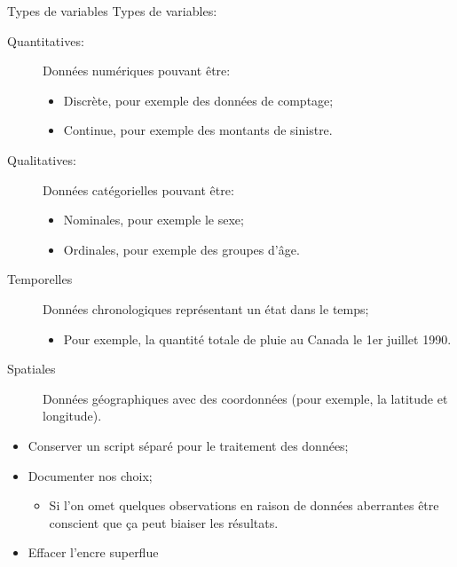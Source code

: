 \documentclass[10pt, french]{article}
\begin{document}
\begin{multicols*}{3}
\begin{conceptgen}{Types de variables}
Types de variables:
\begin{description}
	\item[Quantitatives:]	Données numériques pouvant être:
		\begin{itemize}
		\item	Discrète, pour exemple des données de comptage; 
		\item	Continue, pour exemple des montants de sinistre.
		\end{itemize}
	\item[Qualitatives:]	Données catégorielles pouvant être:
		\begin{itemize}
		\item	Nominales, pour exemple le sexe; 
		\item	Ordinales, pour exemple des groupes d'âge.
		\end{itemize}
	\item[Temporelles]Données chronologiques représentant un état dans le temps;
		\begin{itemize}
		\item	Pour exemple, la quantité totale de pluie au Canada le 1er juillet 1990.
		\end{itemize}
	\item[Spatiales]	Données géographiques avec des coordonnées (pour exemple, la latitude et longitude).
\end{description}
\end{conceptgen}

\begin{algo2}[Conseils]
\begin{itemize}
	\item	Conserver un script séparé pour le traitement des données;
	\item	Documenter nos choix;
		\begin{itemize}
		\item	Si l'on omet quelques observations en raison de données aberrantes être conscient que ça peut biaiser les résultats.
		\end{itemize}
	\item	Effacer l'encre superflue 
	

\end{itemize}
\end{algo2}
\end{multicols*}
\end{document}
